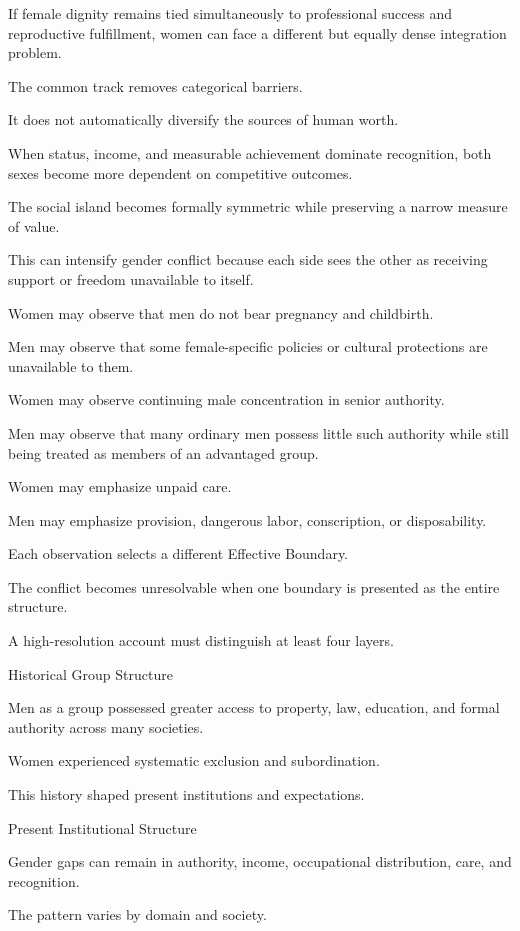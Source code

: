 If female dignity remains tied simultaneously to professional success and reproductive fulfillment, women can face a different but equally dense integration problem.

The common track removes categorical barriers.

It does not automatically diversify the sources of human worth.

When status, income, and measurable achievement dominate recognition, both sexes become more dependent on competitive outcomes.

The social island becomes formally symmetric while preserving a narrow measure of value.

This can intensify gender conflict because each side sees the other as receiving support or freedom unavailable to itself.

Women may observe that men do not bear pregnancy and childbirth.

Men may observe that some female-specific policies or cultural protections are unavailable to them.

Women may observe continuing male concentration in senior authority.

Men may observe that many ordinary men possess little such authority while still being treated as members of an advantaged group.

Women may emphasize unpaid care.

Men may emphasize provision, dangerous labor, conscription, or disposability.

Each observation selects a different Effective Boundary.

The conflict becomes unresolvable when one boundary is presented as the entire structure.

A high-resolution account must distinguish at least four layers.

Historical Group Structure

Men as a group possessed greater access to property, law, education, and formal authority across many societies.

Women experienced systematic exclusion and subordination.

This history shaped present institutions and expectations.

Present Institutional Structure

Gender gaps can remain in authority, income, occupational distribution, care, and recognition.

The pattern varies by domain and society.

